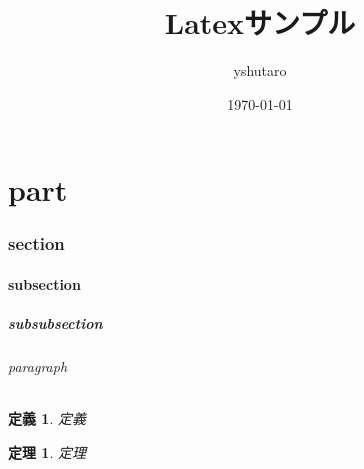 \documentclass[a4paper,11pt]{jsarticle}
\newtheorem{dfn}{定義}
\newtheorem{thm}{定理}
\begin{document}
\title{Latexサンプル}
\author{yshutaro}
\date{\today}
\maketitle


\part{part}
\section{section}
\subsection{subsection}
\subsubsection{subsubsection}
\paragraph{paragraph}


\begin{dfn}
定義
\end{dfn}
\begin{thm}
定理
\end{thm}
\end{document}
